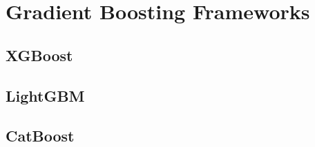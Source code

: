 \section{Gradient Boosting Frameworks}

\subsection*{XGBoost}

\subsection*{LightGBM}

\subsection*{CatBoost}
